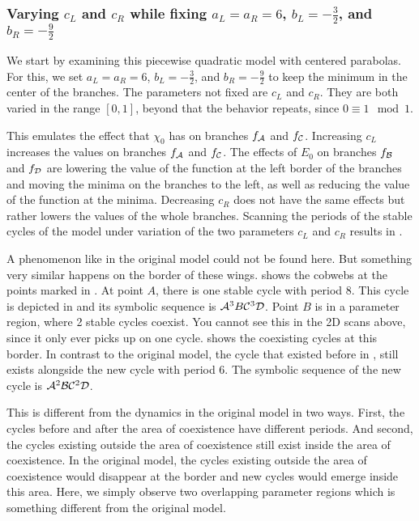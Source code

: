 \subsubsection{Varying $c_L$ and $c_R$ while fixing $a_L = a_R = 6$, $b_L = - \frac{3}{2}$, and $b_R = -\frac{9}{2}$}

We start by examining this piecewise quadratic model with centered parabolas.
For this, we set $a_L = a_R = 6$, $b_L = -\frac{3}{2}$, and $b_R = -\frac{9}{2}$ to keep the minimum in the center of the branches.
The parameters not fixed are $c_L$ and $c_R$.
They are both varied in the range $[0, 1]$, beyond that the behavior repeats, since $0 \equiv 1 \mod 1$.

This emulates the effect that $\chi_0$ has on branches $f_{\mathcal{A}}$ and $f_{\mathcal{C}}$.
Increasing $c_L$ increases the values on branches $f_{\mathcal{A}}$ and $f_{\mathcal{C}}$.
The effects of $E_0$ on branches $f_{\mathcal{B}}$ and $f_{\mathcal{D}}$ are lowering the value of the function at the left border of the branches and moving the minima on the branches to the left, as well as reducing the value of the function at the minima.
Decreasing $c_R$ does not have the same effects but rather lowers the values of the whole branches.
Scanning the periods of the stable cycles of the model under variation of the two parameters $c_L$ and $c_R$ results in .

A phenomenon like in the original model could not be found here.
But something very similar happens on the border of these wings.
 shows the cobwebs at the points marked in .
At point $A$, there is one stable cycle with period 8.
This cycle is depicted in  and its symbolic sequence is $\mathcal{A}^3B\mathcal{C}^3\mathcal{D}$.
Point $B$ is in a parameter region, where 2 stable cycles coexist.
You cannot see this in the 2D scans above, since it only ever picks up on one cycle.
 shows the coexisting cycles at this border.
In contrast to the original model, the cycle that existed before in , still exists alongside the new cycle with period 6.
The symbolic sequence of the new cycle is $\mathcal{A}^2\mathcal{B}\mathcal{C}^2\mathcal{D}$.


This is different from the dynamics in the original model in two ways.
First, the cycles before and after the area of coexistence have different periods.
And second, the cycles existing outside the area of coexistence still exist inside the area of coexistence.
In the original model, the cycles existing outside the area of coexistence would disappear at the border and new cycles would emerge inside this area.
Here, we simply observe two overlapping parameter regions which is something different from the original model.

